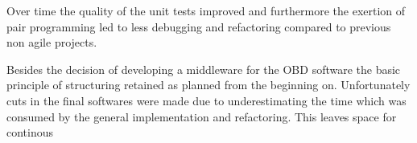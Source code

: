 Over time the quality of the unit tests improved and furthermore the exertion of pair programming led to less debugging and refactoring compared 
to previous non agile projects.

Besides the decision of developing a middleware for the OBD software the basic principle of structuring retained as planned from the beginning 
on. Unfortunately cuts in the final softwares were made due to underestimating the time which was consumed by the general implementation and 
refactoring. This leaves space for continous

